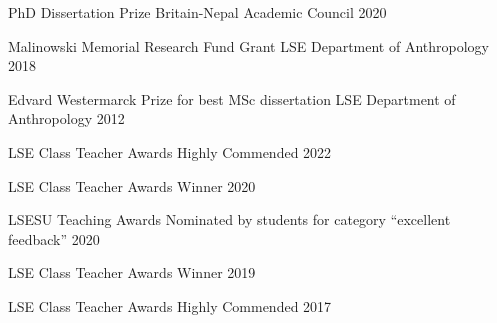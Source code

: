 



\begin{cvhonors}

  \cvhonor
    {PhD Dissertation Prize} %
    {Britain-Nepal Academic Council} %
    {} %
    {2020} %

  \cvhonor
    {Malinowski Memorial Research Fund Grant} %
    {LSE Department of Anthropology} %
    {} %
    {2018} %

  \cvhonor
    {Edvard Westermarck Prize for best MSc dissertation} %
    {LSE Department of Anthropology} %
    {} %
    {2012} %


\end{cvhonors}


\begin{cvhonors}

  \cvhonor
    {LSE Class Teacher Awards} %
    {Highly Commended} %
    {} %
    {2022} %

  \cvhonor
    {LSE Class Teacher Awards} %
    {Winner} %
    {} %
    {2020} %

  \cvhonor
    {LSESU Teaching Awards} %
    {Nominated by students for category ``excellent feedback''} %
    {} %
    {2020} %

  \cvhonor
    {LSE Class Teacher Awards} %
    {Winner} %
    {} %
    {2019} %

  \cvhonor
    {LSE Class Teacher Awards} %
    {Highly Commended} %
    {} %
    {2017} %

\end{cvhonors}

